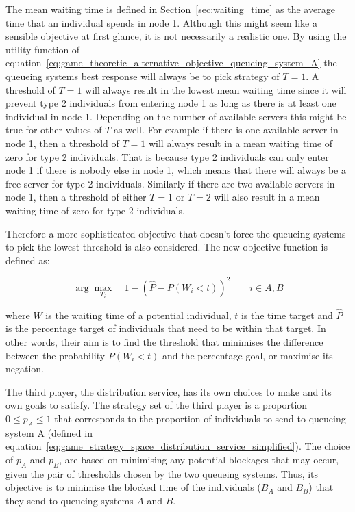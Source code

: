 The mean waiting time is defined in Section~\ref{sec:waiting_time} as the
average time that an individual spends in node 1.
Although this might seem like a sensible objective at first glance, it is not
necessarily a realistic one.
By using the utility function of
equation~\eqref{eq:game_theoretic_alternative_objective_queueing_system_A}
the queueing systems best response will always be to pick strategy of \(T=1\).
A threshold of \(T=1\) will always result in the lowest mean waiting time
since it will prevent type 2 individuals from entering node 1 as long as there
is at least one individual in node 1.
Depending on the number of available servers this might be true for other values
of \(T\) as well.
For example if there is one available server in node 1, then a threshold of
\(T=1\) will always result in a mean waiting time of zero for type 2
individuals.
That is because type 2 individuals can only enter node 1 if there is nobody
else in node 1, which means that there will always be a free server for type 2
individuals.
Similarly if there are two available servers in node 1, then a threshold of
either \(T=1\) or \(T=2\) will also result in a mean waiting time of zero for
type 2 individuals.

Therefore a more sophisticated objective that doesn't force the queueing systems
to pick the lowest threshold is also considered.
The new objective function is defined as:

\begin{equation}\label{eq:obj_queueing_systems}
    \arg \max_{T_i} \quad 1 - \left( \hat{P} - P(W_i < t) \right)^2
    \qquad i \in {A, B}
\end{equation}

where \(W\) is the waiting time of a potential individual, \(t\) is the time
target and \(\hat{P}\) is the percentage target of individuals that need to be
within that target.
In other words, their aim is to find the threshold that minimises the
difference between the probability \(P(W_i < t)\) and the percentage goal,
or maximise its negation.

The third player, the distribution service, has its own choices to make and
its own goals to satisfy.
The strategy set of the third player is a proportion \(0 \leq p_A \leq 1\)
that corresponds to the proportion of individuals to send to queueing system A
(defined in
equation~\eqref{eq:game_strategy_space_distribution_service_simplified}).
The choice of \(p_A\) and \(p_B\), are based on minimising any potential
blockages that may occur, given the pair of thresholds chosen by the two
queueing systems.
Thus, its objective is to minimise the blocked time of the individuals
(\(B_A\) and \(B_B\)) that they send to queueing systems \(A\) and \(B\).

